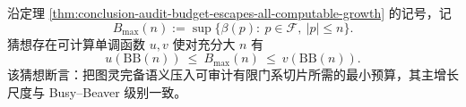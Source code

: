 \begin{conjecture}\label{conj:conclusion-audit-budget-busy-beaver-scale}
沿定理 \ref{thm:conclusion-audit-budget-escapes-all-computable-growth} 的记号，记
\[
B_{\max}(n):=\sup\{\beta(p):\ p\in\mathcal F,\ |p|\le n\}.
\]
猜想存在可计算单调函数 \(u,v\) 使对充分大 \(n\) 有
\[
u(\mathrm{BB}(n))\ \le\ B_{\max}(n)\ \le\ v(\mathrm{BB}(n)).
\]
该猜想断言：把图灵完备语义压入可审计有限门系切片所需的最小预算，其主增长尺度与 Busy--Beaver 级别一致。
\end{conjecture}

\endinput
